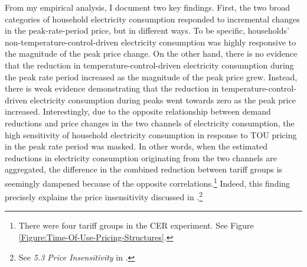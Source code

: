 From my empirical analysis, I document two key findings. First, the two broad categories of household electricity consumption responded to incremental changes in the peak-rate-period price, but in different ways. To be specific, households' non-temperature-control-driven electricity consumption was highly responsive to the magnitude of the peak price change. On the other hand, there is no evidence that the reduction in temperature-control-driven electricity consumption during the peak rate period increased as the magnitude of the peak price grew. Instead, there is weak evidence demonstrating that the reduction in temperature-control-driven electricity consumption during peaks went towards zero as the peak price increased. Interestingly, due to the opposite relationship between demand reductions and price changes in the two channels of electricity consumption, the high sensitivity of household electricity consumption in response to TOU pricing in the peak rate period was masked. In other words, when the estimated reductions in electricity consumption originating from the two channels are aggregated, the difference in the combined reduction between tariff groups is seemingly dampened because of the opposite correlations.\footnote{There were four tariff groups in the CER experiment. See Figure \ref{Figure:Time-Of-Use-Pricing-Structures}.} Indeed, this finding precisely explains the price insensitivity discussed in \cite{Peaking-Interest:How-Awareness-Drives-the-Effectiveness-of-Time-of-Use-Electricity-Pricing_Prest_2020}.\footnote{See \textit{5.3 Price Insensitivity} in \cite{Peaking-Interest:How-Awareness-Drives-the-Effectiveness-of-Time-of-Use-Electricity-Pricing_Prest_2020}.}  

